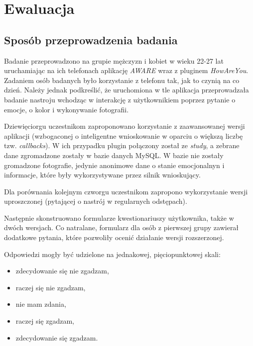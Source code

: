 \chapter{Ewaluacja}
\label{cha:ewaluacja}


\section{Sposób przeprowadzenia badania}
\label{sec:sposobPrzeprowadzeniaBadania}

Badanie przeprowadzono na grupie mężczyzn i kobiet w wieku 22-27 lat uruchamiając na ich telefonach aplikację \textit{AWARE} wraz z pluginem \textit{HowAreYou}. Zadaniem osób badanych było korzystanie z telefonu tak, jak to czynią na co dzień. Należy jednak podkreślić, że uruchomiona w tle aplikacja przeprowadzała badanie nastroju wchodząc w interakcję z użytkownikiem poprzez pytanie o emocje, o kolor i wykonywanie fotografii.

Dziewięciorgu uczestnikom zaproponowano korzystanie z zaawansowanej wersji aplikacji (wzbogaconej o inteligentne wnioskowanie w oparciu o większą liczbę tzw. \textit{callbacks}). W ich przypadku plugin połączony został ze \textit{study}, a zebrane dane zgromadzone zostały w bazie danych MySQL. W bazie nie zostały gromadzone fotografie, jedynie anonimowe dane o stanie emocjonalnyn i informacje, które były wykorzystywane przez silnik wnioskujący.

Dla porównania kolejnym czworgu uczestnikom zapropono wykorzystanie wersji uproszczonej (pytającej o nastrój w regularnych odstępach).

Następnie skonstruowano formularze kwestionariuszy użytkownika, także w dwóch wersjach. Co natralane, formularz dla osób z pierwszej grupy zawierał dodatkowe pytania, które pozwoliły ocenić działanie wersji rozszerzonej.

Odpowiedzi mogły być udzielone na jednakowej, pięciopunktowej skali:
\begin{itemize}
	\item zdecydowanie się nie zgadzam, 
	\item raczej się nie zgadzam,
	\item nie mam zdania,
	\item raczej się zgadzam,
	\item zdecydowanie się zgadzam.
\end{itemize}

